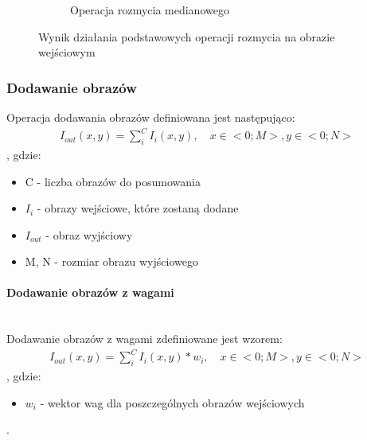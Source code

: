 \begin{figure}
\begin{subfigure}[b]{0.45\textwidth}
    \caption{Operacja rozmycia medianowego}
    \label{fig:smooth_lena_gauss}
  \end{subfigure}
  \caption{Wynik działania podstawowych operacji rozmycia na obrazie wejściowym}
  \label{fig:lena_smooth}
\end{figure}
\subsubsection{Dodawanie obrazów}
Operacja dodawania obrazów definiowana jest następująco:
\begin{gather*}
  I_{out}(x, y) = \displaystyle\sum_{i}^{C} I_i(x, y), \quad x \in <0; M>,  y \in <0; N>
\end{gather*}, gdzie:
\begin{itemize}
  \item C - liczba obrazów do posumowania
  \item $I_i$ - obrazy wejściowe, które zostaną dodane
  \item $I_{out}$ - obraz wyjściowy
  \item M, N - rozmiar obrazu wyjściowego
\end{itemize}
\paragraph{Dodawanie obrazów z wagami} \mbox{}\\
Dodawanie obrazów z wagami zdefiniowane jest wzorem:
\begin{gather*}
  I_{out}(x, y) = \displaystyle\sum_{i}^{C} I_i(x, y) * w_i, \quad x \in <0; M>, y \in <0; N>
\end{gather*}, gdzie:
\begin{itemize}
  \item $w_i$ - wektor wag dla poszczególnych obrazów wejściowych
  \end{itemize}.

